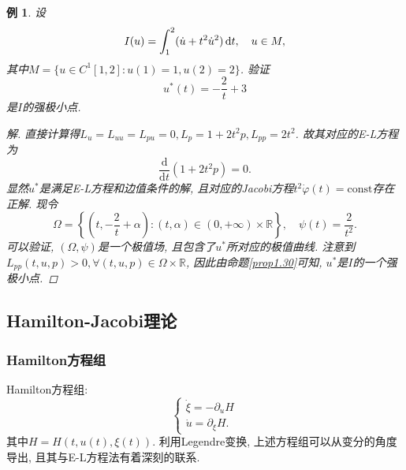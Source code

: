 \documentclass[12pt,a4paper]{article}
\newtheorem{example}[theorem]{例}
\begin{document}
\begin{example}
    设 
    \begin{equation*}
        I(u) = \int_1^2(\dot u + t^2\dot u^2) \,{\rm d}t, \quad u \in M, 
    \end{equation*}
    其中$M = \{u \in C^1[1, 2]\colon u(1) = 1, u(2) = 2\}$. 验证 
    \begin{equation*}
        u^*(t) = -\frac{2}{t} + 3
    \end{equation*}
    是$I$的强极小点.
    \begin{proof}[解]
        直接计算得$L_u = L_{uu} = L_{pu} = 0, L_p = 1 + 2t^2p, L_{pp} = 2t^2$. 故其对应的E-L方程为
        \begin{equation*}
            \frac{\mathrm{d}}{\mathrm{d}t}(1 + 2t^2p) = 0.
        \end{equation*}
        显然$u^*$是满足E-L方程和边值条件的解, 且对应的Jacobi方程$t^2\dot\varphi(t) = \mathrm{const}$存在正解.
        现令 
        \begin{equation*}
            \Omega = \left\{\left(t, -\frac{2}{t} + \alpha\right)\colon (t, \alpha) \in (0, +\infty) \times \mathbb{R}\right\}, \quad \psi(t) = \frac{2}{t^2}. 
        \end{equation*}
        可以验证, $(\Omega, \psi)$是一个极值场, 且包含了$u^*$所对应的极值曲线. 注意到$L_{pp}(t, u, p) > 0, \forall(t, u, p) \in \Omega \times \mathbb{R}$, 因此由命题\ref{prop1.30}可知, $u^*$是$I$的一个强极小点.
    \end{proof}
\end{example}

\subsection{Hamilton-Jacobi理论}

\subsubsection{Hamilton方程组}

Hamilton方程组:
\begin{equation*}
    \begin{cases} 
        \dot\xi = -\partial_u H \\ 
        \dot u = \partial_{\xi}H. 
    \end{cases} 
\end{equation*}
其中$H = H(t, u(t), \xi(t))$. 利用Legendre变换, 上述方程组可以从变分的角度导出, 且其与E-L方程法有着深刻的联系.
\end{document}
